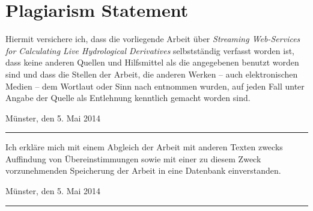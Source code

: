 \documentclass[paper=a4,
               fontsize=11pt,
               bibliography=totoc,
               listof=nochaptergap,
               listof=notoc,
               numbers=noendperiod,
               parskip=half,
               footnotes=multiple,
               toc=numberline,
               captions=tableheading,
               DIV=10,
              ]{scrreprt}
\begin{document}
  \chapter*{Plagiarism Statement}
  Hiermit versichere ich, dass die vorliegende Arbeit über \emph{Streaming Web-Services for Calculating Live Hydrological Derivatives} selbstständig verfasst worden ist, dass keine anderen Quellen und Hilfsmittel als die angegebenen benutzt worden sind und dass die Stellen der Arbeit, die anderen Werken – auch elektronischen Medien – dem Wortlaut oder Sinn nach entnommen wurden, auf jeden Fall unter Angabe der Quelle als Entlehnung kenntlich gemacht worden sind.
  \begin{flushright}
    Münster, den 5. Mai 2014\hspace{.6cm}\rule{6cm}{.5pt}
  \end{flushright}
  \vspace{1cm}

  Ich erkläre mich mit einem Abgleich der Arbeit mit anderen Texten zwecks Auffindung von Übereinstimmungen sowie mit einer zu diesem Zweck vorzunehmenden Speicherung der Arbeit in eine Datenbank einverstanden.

  \begin{flushright}
    Münster, den 5. Mai 2014\hspace{.6cm}\rule{6cm}{.5pt}
  \end{flushright}
\end{document}
